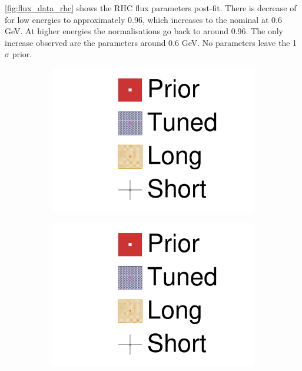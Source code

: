 \autoref{fig:flux_data_rhc} shows the RHC flux parameters post-fit. There is decrease of \numubar for low energies to approximately 0.96, which increases to the nominal at 0.6 GeV. At higher energies the normalisations go back to around 0.96. The only increase observed are the \nuebar parameters around 0.6 GeV. No parameters leave the 1$\sigma$ prior.
\begin{figure}[h]
	\begin{subfigure}[t]{0.24\textwidth}
		\includegraphics[width=\textwidth, trim={0mm 0mm 0mm 0mm}, clip,page=6]{figures/mach3/data/2017b_NewData_NewDet_UpdXsecStep_2Xsec_4Det_5Flux_0_2017b_June_NewDet_merge_2017b_NewDet_June_Long_0}
	\end{subfigure}
	\begin{subfigure}[t]{0.24\textwidth}
		\includegraphics[width=\textwidth, trim={0mm 0mm 0mm 0mm}, clip,page=7]{figures/mach3/data/2017b_NewData_NewDet_UpdXsecStep_2Xsec_4Det_5Flux_0_2017b_June_NewDet_merge_2017b_NewDet_June_Long_0}

\end{subfigure}
\end{figure}
